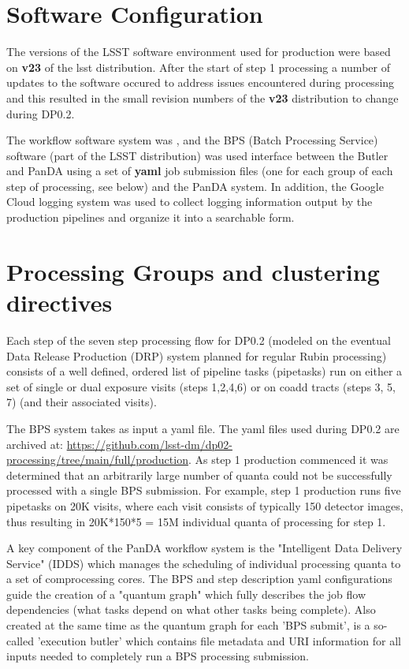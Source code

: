 \documentclass[OPS,authoryear,toc]{lsstdoc}
\begin{document}
\section{Software Configuration}

The versions of the LSST software environment used for production were
based on {\bf v23} of the lsst distribution.  After the start of step 1 
processing a number of updates to
the software occured to address issues encountered during processing
and this resulted in the small revision numbers of the {\bf v23} distribution
to change during DP0.2.

The workflow software system was \cite{PanDA}, and the 
BPS (Batch Processing Service) software 
(part of the LSST distribution) was used interface between the Butler 
and PanDA using a set of {\bf yaml} job submission files 
(one for each group of each step of processing, see below)
and the PanDA system. In addition, the Google Cloud logging system was
used to collect logging information output by the production pipelines and
organize it into a searchable form.

\section{Processing Groups and clustering directives}

Each step of the seven step processing flow for DP0.2 
(modeled on the eventual Data Release Production (DRP) system 
planned for regular Rubin processing) consists of a well
defined, ordered list of pipeline tasks (pipetasks) run on either a set of 
single or dual exposure visits (steps 1,2,4,6) or on 
coadd tracts (steps 3, 5, 7) (and their associated visits).  

The BPS system takes as input a yaml file. The yaml files used during DP0.2 are archived at: \url{https://github.com/lsst-dm/dp02-processing/tree/main/full/production}.  As step 1 production commenced it was determined that an arbitrarily
large number of quanta could not be successfully processed with a single
BPS submission.  For example, step 1 production runs five pipetasks on 
20K visits, where each visit consists of typically 150 detector images,
thus resulting in 20K*150*5 = 15M individual quanta of processing for
step 1.  

A key component of the PanDA workflow system is the "Intelligent Data Delivery Service" (IDDS) which manages the scheduling of individual processing
quanta to a set of comprocessing cores. The BPS and step description yaml configurations guide the creation of a "quantum graph" which fully describes the job flow
dependencies (what tasks depend on what other tasks being complete).  Also
created at the same time as the quantum graph for each 'BPS submit', is a
so-called 'execution butler' which contains file metadata and 
URI information for all inputs needed to completely run a BPS processing submission.
\end{document}
